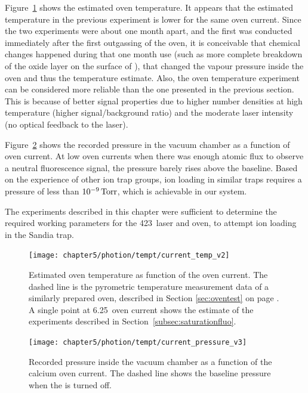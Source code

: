 Figure~\ref{fig:temp_current} shows the estimated oven temperature. It appears that the estimated temperature in the previous experiment is lower for the same oven current. Since the two experiments were about one month apart, and the first was conducted immediately after the first outgassing of the \CaI{} oven, it is conceivable that chemical changes happened during that one month use (such as more complete breakdown of the oxide layer on the surface of \CaI{}), that changed the vapour pressure inside the oven and thus the temperature estimate. Also, the oven temperature experiment can be considered more reliable than the one presented in the previous section. This is because of better signal properties due to higher number densities at high temperature (higher signal/background ratio) and the moderate laser intensity (no optical feedback to the laser).

Figure~\ref{fig:pressure_current} shows the recorded pressure in the vacuum chamber as a function of oven current. At low oven currents when there was enough atomic flux to observe a neutral fluorescence signal, the pressure barely rises above the baseline. Based on the experience of other ion trap groups, ion loading in similar traps requires a pressure of less than $10^{-9}\,\mbox{Torr}$, which is achievable in our system.

The experiments described in this chapter were sufficient to determine the required working parameters for the 423\nm\, laser and \CaI{} oven, to attempt ion loading in the Sandia trap. 


\pagebreak 

\begin{figure}[!t]
\centering
\texttt{[image: chapter5/photion/tempt/current\_temp\_v2]}
\caption[\CaI{} oven temperature as a function of drive current]{Estimated oven temperature as function of the oven current. The dashed line is the pyrometric temperature measurement data of a similarly prepared oven, described in Section \ref{sec:oventest} on page \pageref{sec:oventest}. A single point at 6.25\A\, oven current shows the estimate of the experiments described in Section~\ref{subsec:saturationfluo}. \cversion}
\label{fig:temp_current}
\end{figure} 

\begin{figure}[h!t]
\centering
\texttt{[image: chapter5/photion/tempt/current\_pressure\_v3]}
\caption[Vacuum chamber pressure as a function of \CaI{} oven current]{Recorded pressure inside the vacuum chamber as a function of the calcium oven current. The dashed line shows the baseline pressure when the \CaI{} is turned off.}
\label{fig:pressure_current}
\end{figure} 
